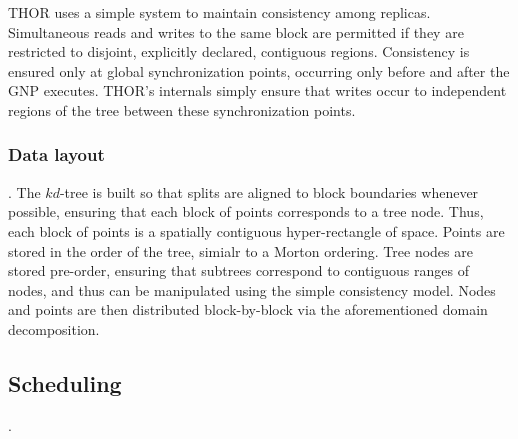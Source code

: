\documentclass[twoside,leqno,twocolumn]{article}
\newcommand{\mysubsub}[1]{\subsubsection{#1}. }
\newcommand{\mysub}[1]{\subsection{#1}. }
\begin{document}
THOR uses a simple system to maintain consistency among replicas.
Simultaneous reads and writes to the same block are permitted if they are restricted to disjoint, explicitly declared, contiguous regions.
Consistency is ensured only at global synchronization points, occurring only before and after the GNP executes.
THOR's internals simply ensure that writes occur to independent regions of the tree between these synchronization points.




\mysubsub{Data layout}
The $kd$-tree is built so that splits are aligned to block boundaries whenever possible, ensuring that each block of points corresponds to a tree node.
Thus, each block of points is a spatially contiguous hyper-rectangle of space.
Points are stored in the order of the tree, simialr to a Morton ordering.
Tree nodes are stored pre-order, ensuring that subtrees correspond to contiguous ranges of nodes, and thus can be manipulated using the simple consistency model.
Nodes and points are then distributed block-by-block via the aforementioned domain decomposition.

\mysub{Scheduling}
\end{document}
